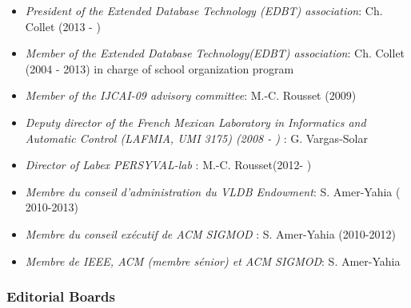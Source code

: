 \begin{itemize}
\setlength{\itemindent}{-0.5cm}
\setlength{\itemsep}{-0.1cm}

\item {\it President of the Extended Database Technology (EDBT) association}: Ch. Collet (2013 - )

\item {\it Member of the Extended Database Technology(EDBT) association}: Ch. Collet (2004 - 2013) in charge of  school organization program

\item {\it Member of the IJCAI-09 advisory committee}: M.-C. Rousset (2009)

\item {\it Deputy director of the French Mexican Laboratory in Informatics and Automatic Control (LAFMIA, UMI 3175) (2008 - ) }:  G. Vargas-Solar

\item {\it Director of Labex PERSYVAL-lab  }:  M.-C. Rousset(2012- )

\item \emph{Membre du conseil d'administration du VLDB Endowment}:  S. Amer-Yahia ( 2010-2013)

\item \emph{Membre du conseil ex\'ecutif de ACM SIGMOD }:  S. Amer-Yahia (2010-2012)

\item \emph{Membre de IEEE, ACM (membre s\'enior) et ACM SIGMOD}:  S. Amer-Yahia

\end{itemize}

\subsubsection*{Editorial Boards}


